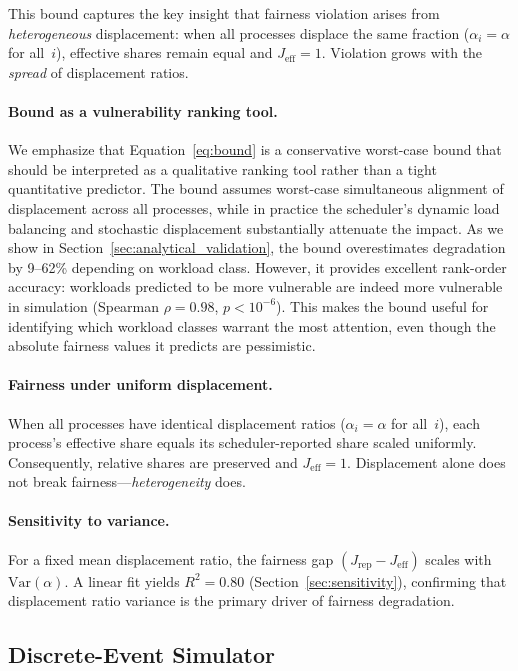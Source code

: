 \documentclass{article}
\newcommand{\displacement}{\alpha}
\newcommand{\jeff}{J_{\mathrm{eff}}}
\newcommand{\jrep}{J_{\mathrm{rep}}}
\begin{document}
This bound captures the key insight that fairness violation arises from \emph{heterogeneous} displacement: when all processes displace the same fraction ($\displacement_i = \displacement$ for all~$i$), effective shares remain equal and $\jeff = 1$. Violation grows with the \emph{spread} of displacement ratios.

\paragraph{Bound as a vulnerability ranking tool.}
We emphasize that Equation~\ref{eq:bound} is a conservative worst-case bound that should be interpreted as a qualitative ranking tool rather than a tight quantitative predictor. The bound assumes worst-case simultaneous alignment of displacement across all processes, while in practice the scheduler's dynamic load balancing and stochastic displacement substantially attenuate the impact. As we show in Section~\ref{sec:analytical_validation}, the bound overestimates degradation by 9--62\% depending on workload class. However, it provides excellent rank-order accuracy: workloads predicted to be more vulnerable are indeed more vulnerable in simulation (Spearman $\rho = 0.98$, $p < 10^{-6}$). This makes the bound useful for identifying which workload classes warrant the most attention, even though the absolute fairness values it predicts are pessimistic.

\paragraph{Fairness under uniform displacement.}
When all processes have identical displacement ratios ($\displacement_i = \displacement$ for all~$i$), each process's effective share equals its scheduler-reported share scaled uniformly. Consequently, relative shares are preserved and $\jeff = 1$. Displacement alone does not break fairness---\emph{heterogeneity} does.

\paragraph{Sensitivity to variance.}
For a fixed mean displacement ratio, the fairness gap $(\jrep - \jeff)$ scales with $\mathrm{Var}(\displacement)$. A linear fit yields $R^2 = 0.80$ (Section~\ref{sec:sensitivity}), confirming that displacement ratio variance is the primary driver of fairness degradation.

\subsection{Discrete-Event Simulator}
\label{sec:simulator}
\end{document}
